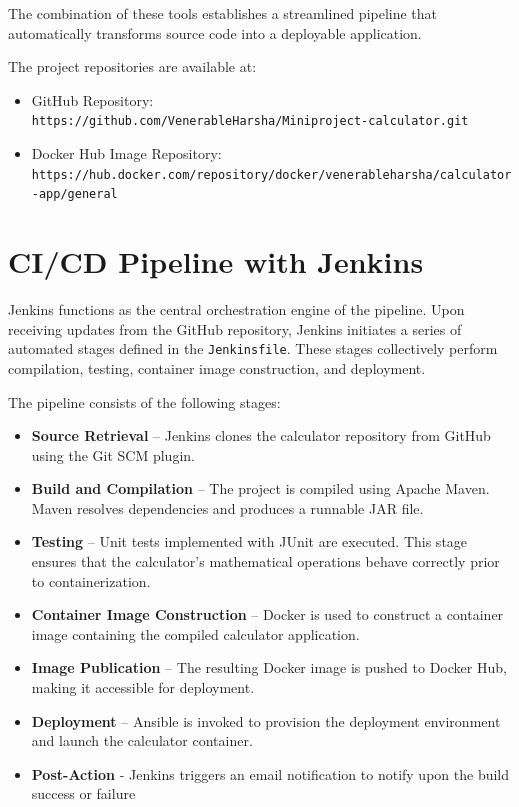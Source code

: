 \documentclass[12pt]{article}
\begin{document}
The combination of these tools establishes a streamlined pipeline that 
automatically transforms source code into a deployable application.

\bigskip

The project repositories are available at:

\begin{itemize}
\item GitHub Repository: \\
\texttt{https://github.com/VenerableHarsha/Miniproject-calculator.git}

\item Docker Hub Image Repository: \\
\texttt{https://hub.docker.com/repository/docker/venerableharsha/calculator-app/general}
\end{itemize}
\section{CI/CD Pipeline with Jenkins}

Jenkins functions as the central orchestration engine of the pipeline. 
Upon receiving updates from the GitHub repository, Jenkins initiates a 
series of automated stages defined in the \texttt{Jenkinsfile}. 
These stages collectively perform compilation, testing, container image 
construction, and deployment.

The pipeline consists of the following stages:

\begin{itemize}
\item \textbf{Source Retrieval} – Jenkins clones the calculator repository 
from GitHub using the Git SCM plugin.

\item \textbf{Build and Compilation} – The project is compiled using 
Apache Maven. Maven resolves dependencies and produces a runnable JAR file.

\item \textbf{Testing} – Unit tests implemented with JUnit are executed. 
This stage ensures that the calculator's mathematical operations behave 
correctly prior to containerization.

\item \textbf{Container Image Construction} – Docker is used to construct 
a container image containing the compiled calculator application.

\item \textbf{Image Publication} – The resulting Docker image is pushed to 
Docker Hub, making it accessible for deployment.

\item \textbf{Deployment} – Ansible is invoked to provision the deployment 
environment and launch the calculator container.

\item \textbf{Post-Action} - Jenkins triggers an email notification to notify upon the build success or failure
\end{itemize}
\end{document}
